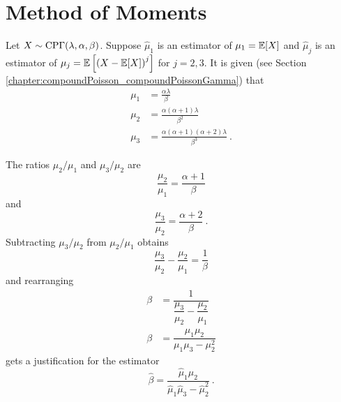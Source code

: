 \section{Method of Moments}
\label{chapter:appendix_methodofmoments}
Let $X\sim\operatorname{CP\Gamma}(\lambda,\alpha,\beta)$. Suppose $\widehat{\mu}_1$ is an estimator of $\mu_1=\operatorname{\mathbb{E}}[X]$ and $\widehat{\mu}_j$ is an estimator of $\mu_j=\operatorname{\mathbb{E}}\left[\left(X-\operatorname{\mathbb{E}}[X]\right)^j\right]$ for $j=2,3$. It is given (see Section \ref{chapter:compoundPoisson_compoundPoissonGamma}) that
\begin{align}
  \mu_1&=\frac{\alpha\lambda}{\beta}
  \label{eq:appendix_methodofmoments_mu1}
  \\
  \mu_2&=\frac{\alpha(\alpha+1)\lambda}{\beta^2}
  \label{eq:appendix_methodofmoments_mu2}
  \\
  \mu_3&= \frac{\alpha(\alpha+1)(\alpha+2)\lambda}{\beta^3}
  \label{eq:appendix_methodofmoments_mu3}
  \ .
\end{align}

The ratios $\mu_2/\mu_1$ and $\mu_3/\mu_2$ are
\begin{equation}
\dfrac{\mu_2}{\mu_1}= \dfrac{\alpha+1}{\beta}
\label{eq:appendix_methodofmoments_ratio1}
\end{equation}
and
\begin{equation}
\dfrac{\mu_3}{\mu_2} = \dfrac{\alpha+2}{\beta} \ .
\label{eq:appendix_methodofmoments_ratio2}
\end{equation}
Subtracting $\mu_3/\mu_2$ from $\mu_2/\mu_1$ obtains
\begin{equation*}
  \dfrac{\mu_3}{\mu_2}-\dfrac{\mu_2}{\mu_1}=
  \dfrac{1}{\beta}
\end{equation*}
and rearranging
\begin{align}
  \beta&=\dfrac{1}{\dfrac{\mu_3}{\mu_2}-\dfrac{\mu_2}{\mu_1}}
  \nonumber\\
  \beta&=\dfrac{\mu_1\mu_2}{\mu_1\mu_3-\mu_2^2}
  \label{eq:appendix_methodofmoments_beta}
\end{align}
gets a justification for the estimator
\begin{equation}
  \widehat{\beta}=\dfrac{\widehat{\mu}_1\widehat{\mu}_2}{\widehat{\mu}_1\widehat{\mu}_3-\widehat{\mu}_2^2} \ .
\end{equation}

